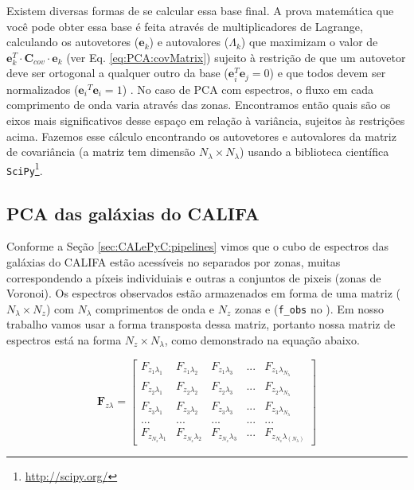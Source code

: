 Existem diversas formas de se calcular essa base final. A prova matemática que você pode obter essa base é feita através
de multiplicadores de Lagrange, calculando os autovetores ($\mathbf{e}{}_k$) e autovalores ($\Lambda_k$) que maximizam o
valor de $\mathbf{e}{}_k^T \cdot \mathbf{C}{}_{cov} \cdot \mathbf{e}{}_k$ (ver Eq. \ref{eq:PCA:covMatrix}) sujeito à
restrição de que um autovetor deve ser ortogonal a qualquer outro da base ($\mathbf{e}{}_i^T \mathbf{e}{}_j = 0$) e que
todos devem ser normalizados ($\mathbf{e}{}_i{}^T \mathbf{e}{}_i = 1$) \citep[][p. 5-6]{JolliffePCA1986}. No caso de PCA
com espectros, o fluxo em cada comprimento de onda varia através das zonas. Encontramos então quais são os eixos mais
significativos desse espaço em relação à variância, sujeitos às restrições acima. Fazemos esse cálculo encontrando os
autovetores e autovalores da matriz de covariância (a matriz tem dimensão $N_\lambda \times N_\lambda$) usando a
biblioteca científica \texttt{SciPy}\footnote{\url{http://scipy.org/}}.

\subsection{PCA das galáxias do CALIFA}

Conforme a Seção \ref{sec:CALePyC:pipelines} vimos que o cubo de espectros das galáxias do CALIFA estão acessíveis no
\pycasso separados por zonas, muitas correspondendo a píxeis individuiais e outras a conjuntos de pixeis (zonas de
Voronoi). Os espectros observados estão armazenados em forma de uma matriz ($N_\lambda \times N_z$) com $N_\lambda$
comprimentos de onda e $N_z$ zonas e (\texttt{f\_obs} no \pycasso). Em nosso trabalho vamos usar a forma transposta dessa
matriz, portanto nossa matriz de espectros está na forma $N_z \times N_\lambda$, como demonstrado na equação abaixo.

\begin{equation}
    \label{eq:PCA:fluxMatrix}
    \textbf{F}{}_{z \lambda} = \left[
    \begin{array}{ccccc}
        F_{z_1 \lambda_1} & F_{z_1 \lambda_2} & F_{z_1 \lambda_3} & ... & F_{z_1 \lambda_{N_\lambda}} \\
        F_{z_2 \lambda_1} & F_{z_2 \lambda_2} & F_{z_2 \lambda_3} & ... & F_{z_2 \lambda_{N_\lambda}} \\
        F_{z_3 \lambda_1} & F_{z_3 \lambda_2} & F_{z_3 \lambda_3} & ... & F_{z_3 \lambda_{N_\lambda}} \\
        ...               & ...               & ...               & ... & ...               \\
        F_{z_{N_z} \lambda_1} & F_{z_{N_z} \lambda_2} & F_{z_{N_z} \lambda_3} & ... & F_{z_{N_z}
        \lambda_{(N_\lambda)}}
    \end{array} 
    \right]
\end{equation}

